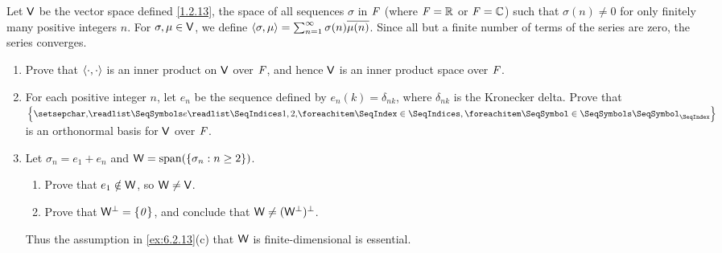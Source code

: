 \setcounter{ex}{22}
\begin{ex}\label{ex:6.2.23}
	Let \(\mathsf{V}\) be the vector space defined \cref{1.2.13}, the space of all sequences \(\sigma\) in \(\mathit{F}\) (where \(\mathit{F} = \mathbb{R}\) or \(\mathit{F} = \mathbb{C}\)) such that \(\sigma(n) \neq 0\) for only finitely many positive integers \(n\).
	For \(\sigma, \mu \in \mathsf{V}\), we define \(\left\langle\sigma, \mu\right\rangle = \sum_{n = 1}^\infty \sigma(n) \overline{\mu(n)}\).
	Since all but a finite number of terms of the series are zero, the series converges.
	\begin{enumerate}
		\item Prove that \(\left\langle\cdot, \cdot\right\rangle\) is an inner product on \(\mathsf{V}\) over \(\mathit{F}\), and hence \(\mathsf{V}\) is an inner product space over \(\mathit{F}\).
		\item For each positive integer \(n\), let \(e_n\) be the sequence defined by \(e_n(k) = \delta_{n k}\), where \(\delta_{n k}\) is the Kronecker delta.
		      Prove that \(\set{\seq{e}{1,2,}}\) is an orthonormal basis for \(\mathsf{V}\) over \(\mathit{F}\).
		\item Let \(\sigma_n = e_1 + e_n\) and \(\W = \spn{\set{\sigma_n : n \geq 2}}\).
		      \begin{enumerate}
			      \item Prove that \(e_1 \notin \mathsf{W}\), so \(\mathsf{W} \neq \mathsf{V}\).
			      \item Prove that \(\mathsf{W}^{\perp} = \left\lbrace\mathit{0}\right\rbrace\), and conclude that \(\mathsf{W} \neq (\mathsf{W}^{\perp})^{\perp}\).
		      \end{enumerate}
		      Thus the assumption in \cref{ex:6.2.13}(c) that \(\mathsf{W}\) is finite-dimensional is essential.
	\end{enumerate}
\end{ex}

